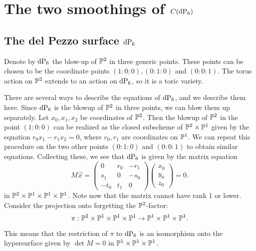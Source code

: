 \chapter{The two smoothings of \texorpdfstring{$C(\dP6)$}{C(dP6)}}

\section{The del Pezzo surface \texorpdfstring{$\dP6$}{dP6}}
\label{sec:twosmoothings}

Denote by $\dP6$ the blow-up of $\P^2$ in three generic points.  These points can be chosen to be the coordinate points $(1:0:0),(0:1:0)$ and $(0:0:1)$. The torus action on $\P^2$ extends to an action on $\dP6$, so it is a toric variety.


There are several ways to describe the equations of $\dP6$, and we describe them here. Since $\dP6$ is the blowup of $\P^2$ in three points, we can blow them up separately. Let $x_0,x_1,x_2$ be coordinates of $\P^2$. Then the blowup of $\P^2$ in the point $(1:0:0)$ can be realized as the closed subscheme of $\P^2 \times \P^1$ given by the equation $r_0x_1-r_1x_2=0$, where $r_0,r_1$ are coordinates on $\P^1$. We can repeat this procedure on the two other points $(0:1:0)$ and $(0:0:1)$ to obtain similar equations. Collecting these, we see that $\dP6$ is given by the matrix equation
\[
M\vec x = 
\begin{pmatrix}
0 & r_0 & -r_1 \\
s_1 & 0 & -s_0 \\
-t_0 & t_1 & 0
\end{pmatrix}
\begin{pmatrix}
x_0 \\ y_0 \\ z_0
\end{pmatrix}= 0.
\]
in $\P^2 \times \P^1 \times \P^1 \times \P^1$. Note now that the matrix cannot have rank $1$ or lower. Consider the projection onto forgetting the $\P^2$-factor:
$$
\pi:\P^2 \times \P^1 \times \P^1 \times \P^1 \to \P^1 \times \P^1 \times \P^1.
$$

This means that the restriction of $\pi$ to $\dP6$ is an isomorphism onto the hypersurface given by $\det M=0$ in $\P^1 \times \P^1 \times \P^1$.


